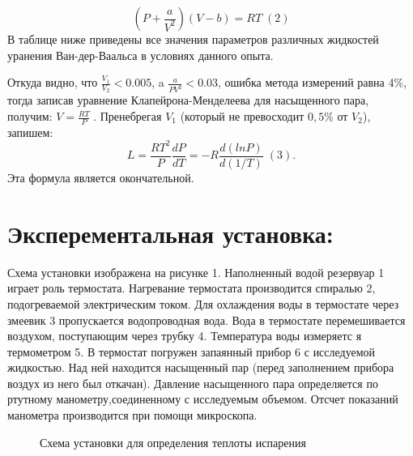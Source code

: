 \documentclass[a4paper,12pt]{article}
\begin{document}
$$(P+\frac{a}{V^2})(V-b)=RT \; (2)$$
В таблице ниже приведены все значения параметров различных жидкостей уранения Ван-дер-Ваальса в условиях данного опыта.
\begin{figure}[h]
\end{figure}
Откуда видно, что $\frac{V_1}{V_2} < 0.005$, a $\frac{a}{PV^2}<0.03$, ошибка метода измерений равна 4\%, тогда записав уравнение Клапейрона-Менделеева для насыщенного пара, получим:
$V=\frac{RT}{P}\;.$
Пренебрегая $V_1$ (который не превосходит $0,5\%$ от $V_2$), запишем:
$$L=\frac{RT^2}{P} \frac{dP}{dT} = -R\frac{d(lnP)}{d(1/T)}\;(3).$$
Эта формула является окончательной.
\section{Эксперементальная установка:}

Схема установки изображена на рисунке 1. Наполненный водой резервуар 1 играет роль термостата. Нагревание термостата производится спиралью 2, подогреваемой электрическим током. Для охлаждения воды в термостате через змеевик 3 пропускается водопроводная вода. Вода в термостате перемешивается воздухом,
поступающим через трубку 4. Температура воды измеряетс
я термометром 5. В термостат погружен запаянный прибор 6 с исследуемой жидкостью. Над ней находится насыщенный пар (перед заполнением прибора воздух из него был откачан).
Давление насыщенного пара определяется по ртутному манометру,соединенному с исследуемым объемом. Отсчет показаний манометра производится при помощи микроскопа.


\begin{figure}[h]
	\caption{Схема установки для определения теплоты испарения}
\end{figure}
\end{document}
